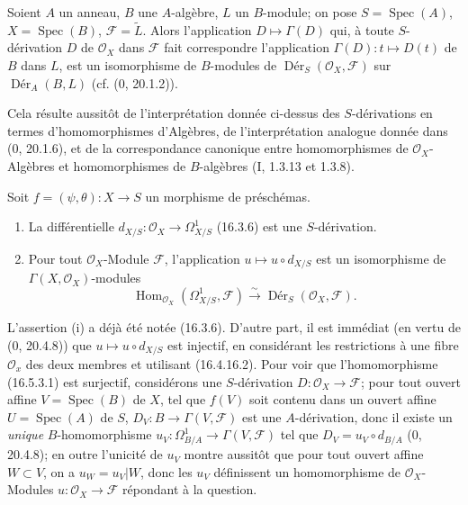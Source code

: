 \begin{proposition}[16.5.2]
\label{IV.16.5.2}
Soient $A$ un anneau, $B$ une $A$-algèbre, $L$ un $B$-module; on pose
$S=\operatorname{Spec}(A)$, $X=\operatorname{Spec}(B)$,
$\mathscr{F}=\widetilde{L}$. Alors l'application $D\mapsto\Gamma(D)$ qui, à
toute $S$-dérivation $D$ de $\mathcal{O}_X$ dans $\mathscr{F}$ fait
correspondre l'application $\Gamma(D):t\mapsto D(t)$ de $B$ dans $L$, est un
isomorphisme de $B$-modules de
$\operatorname{Dér}_S(\mathcal{O}_X,\mathscr{F})$ sur
$\operatorname{Dér}_A(B,L)$ (cf. (0, 20.1.2)).
\end{proposition}

Cela résulte aussitôt de l'interprétation donnée ci-dessus des $S$-dérivations
en termes
d'homomorphismes d'Algèbres, de l'interprétation analogue donnée dans
(0, 20.1.6), et de la correspondance canonique entre homomorphismes de
$\mathcal{O}_X$-Algèbres et homomorphismes de $B$-algèbres (I, 1.3.13 et
1.3.8).

\begin{proposition}[16.5.3]
\label{IV.16.5.3}
Soit $f=(\psi,\theta):X\to S$ un morphisme de préschémas.
\begin{enumerate}
\item[(i)] La différentielle
$d_{X/S}:\mathcal{O}_X\to\Omega_{X/S}^1$ (16.3.6) est une $S$-dérivation.
\item[(ii)] Pour tout $\mathcal{O}_X$-Module $\mathscr{F}$, l'application
$u\mapsto u\circ d_{X/S}$ est un isomorphisme de
$\Gamma(X,\mathcal{O}_X)$-modules
\[
  \operatorname{Hom}_{\mathcal{O}_X}(\Omega_{X/S}^1,\mathscr{F})
  \xrightarrow{\sim}
  \operatorname{Dér}_S(\mathcal{O}_X,\mathscr{F}).
  \tag{16.5.3.1}
  \label{IV.16.5.3.1}
\]
\end{enumerate}
\end{proposition}

L'assertion (i) a déjà été notée (16.3.6). D'autre part, il est immédiat (en
vertu de (0, 20.4.8)) que $u\mapsto u\circ d_{X/S}$ est injectif, en
considérant les restrictions à une fibre $\mathcal{O}_x$ des deux membres et
utilisant (16.4.16.2). Pour voir que l'homomorphisme (16.5.3.1) est surjectif,
considérons une $S$-dérivation $D:\mathcal{O}_X\to\mathscr{F}$; pour tout
ouvert affine $V=\operatorname{Spec}(B)$ de $X$, tel que $f(V)$ soit contenu
dans un ouvert affine $U=\operatorname{Spec}(A)$ de $S$,
$D_V:B\to\Gamma(V,\mathscr{F})$ est une $A$-dérivation, donc il existe un
\emph{unique} $B$-homomorphisme
$u_V:\Omega_{B/A}^1\to\Gamma(V,\mathscr{F})$ tel que
$D_V=u_V\circ d_{B/A}$ (0, 20.4.8); en outre l'unicité de $u_V$ montre
aussitôt que pour tout ouvert affine $W\subset V$, on a $u_W=u_V|W$, donc les
$u_V$ définissent un homomorphisme de $\mathcal{O}_X$-Modules
$u:\mathcal{O}_X\to\mathscr{F}$ répondant à la question.

